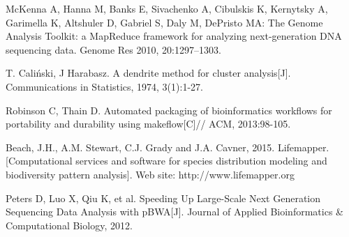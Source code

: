 \documentclass[conference]{IEEEtran}
\begin{document}
\begin{thebibliography}{99}
 McKenna A, Hanna M, Banks E, Sivachenko A, Cibulskis K, Kernytsky A, Garimella K, Altshuler D, Gabriel S, Daly M, DePristo MA: The Genome Analysis Toolkit: a MapReduce framework for analyzing next-generation DNA sequencing data. Genome Res 2010, 20:1297–1303.

 T. Caliński, J Harabasz. A dendrite method for cluster analysis[J]. Communications in Statistics, 1974, 3(1):1-27.

 Robinson C, Thain D. Automated packaging of bioinformatics workflows for portability and durability using makeflow[C]// ACM, 2013:98-105.

 Beach, J.H., A.M. Stewart, C.J. Grady and J.A. Cavner, 2015. Lifemapper. [Computational services and software for species distribution modeling and biodiversity pattern analysis]. Web site: http://www.lifemapper.org 

 Peters D, Luo X, Qiu K, et al. Speeding Up Large-Scale Next Generation Sequencing Data Analysis with pBWA[J]. Journal of Applied Bioinformatics \& Computational Biology, 2012.

\end{thebibliography}
\vspace{12pt}
\end{document}
